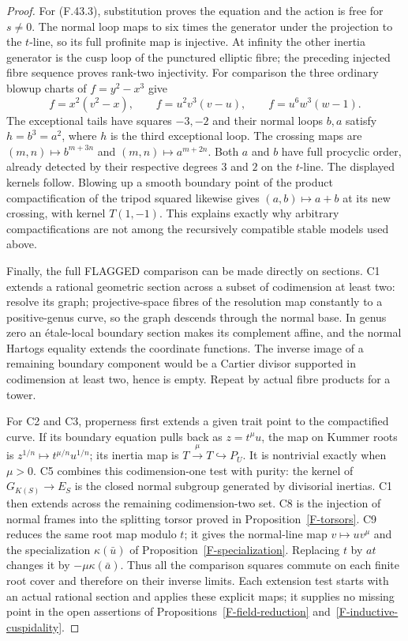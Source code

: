 \documentclass[11pt,oneside]{article}
\begin{document}
\begin{proof}
For (F.43.3), substitution proves the equation and the
action is free for $s\ne0$. The normal loop maps to six
times the generator under the projection to the $t$-line,
so its full profinite map is injective. At infinity the
other inertia generator is the cusp loop of the punctured
elliptic fibre; the preceding injected fibre sequence
proves rank-two injectivity. For comparison the three
ordinary blowup charts of $f=y^2-x^3$ give
\[
 f=x^2(v^2-x),\qquad f=u^2v^3(v-u),\qquad
 f=u^6w^3(w-1).
\]
The exceptional tails have squares $-3,-2$ and their
normal loops $b,a$ satisfy $h=b^3=a^2$, where $h$ is
the third exceptional loop. The crossing maps are
$(m,n)\mapsto b^{m+3n}$ and $(m,n)\mapsto a^{m+2n}$.
Both $a$ and $b$ have full procyclic order, already
detected by their respective degrees $3$ and $2$ on the
$t$-line. The displayed kernels follow. Blowing up a
smooth boundary point of the product compactification of
the tripod squared likewise gives $(a,b)\mapsto a+b$
at its new crossing, with kernel $T(1,-1)$. This explains
exactly why arbitrary compactifications are not among
the recursively compatible stable models used above.

Finally, the full FLAGGED comparison can be made directly
on sections. C1 extends a rational geometric section
across a subset of codimension at least two: resolve its
graph; projective-space fibres of the resolution map
constantly to a positive-genus curve, so the graph
descends through the normal base. In genus zero an
\'etale-local boundary section makes its complement
affine, and the normal Hartogs equality extends the
coordinate functions. The inverse image of a remaining
boundary component would be a Cartier divisor supported
in codimension at least two, hence is empty. Repeat by
actual fibre products for a tower.

For C2 and C3, properness first extends a given trait
point to the compactified curve. If its boundary equation
pulls back as $z=t^\mu u$, the map on Kummer roots is
$z^{1/n}\mapsto t^{\mu/n}u^{1/n}$; its inertia map is
$T\xrightarrow{\mu}T\hookrightarrow P_U$. It is
nontrivial exactly when $\mu>0$. C5 combines this
codimension-one test with purity: the kernel of
$G_{K(S)}\to E_S$ is the closed normal subgroup generated
by divisorial inertias. C1 then extends across the
remaining codimension-two set. C8 is the injection of
normal frames into the splitting torsor proved in
Proposition~\ref{F-torsors}. C9 reduces the same root map
modulo $t$; it gives the normal-line map $v\mapsto u v^\mu$
and the specialization $\kappa(\bar u)$ of
Proposition~\ref{F-specialization}. Replacing $t$ by $at$
changes it by $-\mu\kappa(\bar a)$. Thus all the
comparison squares commute on each finite root cover
and therefore on their inverse limits. Each extension
test starts with an actual rational section and applies
these explicit maps; it supplies no missing point in
the open assertions of Propositions~\ref{F-field-reduction}
and~\ref{F-inductive-cuspidality}.
\end{proof}
\end{document}
